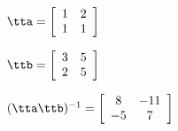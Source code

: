 {$\tta = \left[
\begin{array}{cc}
  1 & 2 \\
 1 & 1
\end{array}
\right]$

$\ttb = \left[
\begin{array}{cc}
 3 & 5 \\
 2 & 5
\end{array}
\right]$}
{$(\tta\ttb)^{-1} = \left[
\begin{array}{cc}
 8 & -11 \\
 -5 & 7
\end{array}
\right]$}
